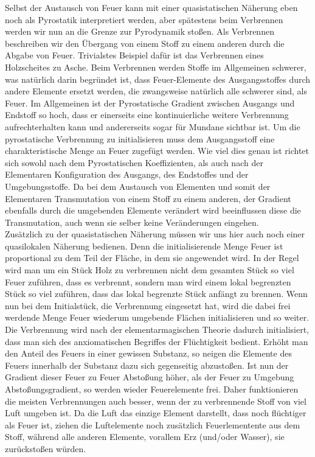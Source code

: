 \documentclass[a5paper,8pt]{book}
\begin{document}
Selbst der Austausch von Feuer kann mit einer quasistatischen Näherung eben noch als Pyrostatik interpretiert werden, aber 
spätestens beim Verbrennen werden wir nun an die Grenze zur Pyrodynamik stoßen.
Als Verbrennen beschreiben wir den Übergang von einem Stoff zu einem anderen durch die Abgabe von Feuer. Trivialstes 
Beispiel dafür ist das Verbrennen eines Holzscheites zu Asche.
Beim Verbrennen werden Stoffe im Allgemeinen schwerer, was natürlich darin begründet ist, dass Feuer-Elemente des 
Ausgangsstoffes durch andere Elemente ersetzt werden, die zwangsweise natürlich alle schwerer sind, als Feuer.
Im Allgemeinen ist der Pyrostatische Gradient zwischen Ausgangs und Endstoff so hoch, dass er einerseits eine 
kontinuierliche weitere Verbrennung aufrechterhalten kann und andererseits sogar für Mundane sichtbar ist.
Um die pyrostatische Verbrennung zu initialisieren muss dem Ausgangsstoff eine charakteristische Menge an Feuer zugefügt 
werden. Wie viel dies genau ist richtet sich sowohl nach dem Pyrostatischen Koeffizienten, als auch nach der Elementaren 
Konfiguration des Ausgangs, des Endstoffes und der Umgebungsstoffe. Da bei dem Austausch von Elementen und somit der 
Elementaren Transmutation von einem Stoff zu einem anderen, der Gradient ebenfalls durch die umgebenden Elemente verändert
wird beeinflussen diese die Transmutation, auch wenn sie selber keine Veränderungen eingehen.\\

Zusätzlich zu der quasistatischen Näherung müssen wir uns hier auch noch einer quasilokalen Näherung bedienen. Denn die 
initialisierende Menge Feuer ist proportional zu dem Teil der Fläche, in dem sie angewendet wird. In der Regel wird man um 
ein Stück Holz zu verbrennen nicht dem gesamten Stück so viel Feuer zuführen, dass es verbrennt, sondern man wird einem 
lokal begrenzten Stück so viel zuführen, dass das lokal begrenzte Stück anfängt zu brennen. Wenn nun bei dem Initialstück, 
die Verbrennung eingesetzt hat, wird die dabei frei werdende Menge Feuer wiederum umgebende Flächen initialisieren und so 
weiter.
Die Verbrennung wird nach der elementarmagischen Theorie dadurch initialisiert, dass man sich des anxiomatischen Begriffes 
der Flüchtigkeit bedient. Erhöht man den Anteil des Feuers in einer gewissen Substanz, so neigen die Elemente des Feuers 
innerhalb der Substanz dazu sich gegenseitig abzustoßen. Ist nun der Gradient dieser Feuer zu Feuer Abstoßung höher, als 
der Feuer zu Umgebung Abstoßungsgradient, so werden wieder Feuerelemente frei. Daher funktionieren die meisten 
Verbrennungen auch besser, wenn der zu verbrennende Stoff von viel Luft umgeben ist. Da die Luft das einzige Element 
darstellt, dass noch flüchtiger als Feuer ist, ziehen die Luftelemente noch zusätzlich Feuerlementente aus dem Stoff,
während alle anderen Elemente, vorallem Erz (und/oder Wasser), sie zurückstoßen würden.
\end{document}
